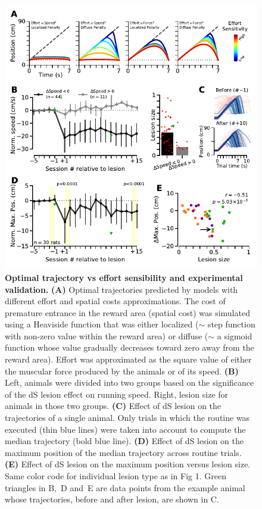 \begin{figure}[bth!]
	\begin{center}
	   \includegraphics[scale=1]{ch-lesion/figures/MaxPosAnalysis.pdf}
	   \caption
	   {\textbf{Optimal trajectory vs effort sensibility and experimental validation.}
	   \textbf{(A)} Optimal trajectories predicted by models with different effort and spatial costs approximations.
	   The cost of premature entrance in the reward area (spatial cost) was simulated using a Heaviside function that was either localized ($\sim$ step function with non-zero value within the reward area) or diffuse ($\sim$ a sigmoid function whose value gradually decreases toward zero away from the reward area).
	   Effort was approximated as the square value of either the muscular force produced by the animals or of its speed.
	   \textbf{(B)} Left, animals were divided into two groups based on the significance of the dS lesion effect on running speed. Right, lesion size for animals in those two groups.
	   \textbf{(C)} Effect of dS lesion on the trajectories of a single animal. Only trials in which the routine was executed (thin blue lines) were taken into account to compute the median trajectory (bold blue line).
	   \textbf{(D)} Effect of dS lesion on the maximum position of the median trajectory across routine trials.
	   \textbf{(E)} Effect of dS lesion on the maximum position versus lesion size.
	   Same color code for individual lesion type as in Fig 1.
	   Green triangles in B,~D and~E are data points from the example animal whose trajectories, before and after lesion, are shown in C.
	   }
	   \label{fig:lesion:maxPos}
	   \end{center}
   \end{figure}